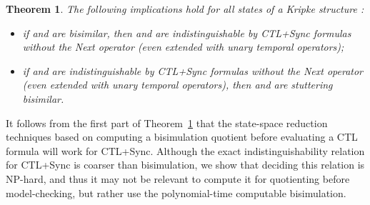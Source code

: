 \documentclass{article}
\newtheorem{theorem}{Theorem}
\begin{document}
\begin{theorem}\label{theo:CTL+Sync-without-next-indistinguishability}
The following implications hold for all states  of a Kripke structure :
\begin{itemize}

\item if  and  are bisimilar, then  and  are indistinguishable 
by CTL+Sync formulas without the Next operator (even extended with unary temporal operators);

\item if  and  are indistinguishable by CTL+Sync formulas without the Next operator
(even extended with unary temporal operators), then  and  are stuttering bisimilar.

\end{itemize}
\end{theorem}

It follows from the first part of Theorem~\ref{theo:CTL+Sync-without-next-indistinguishability}
that the state-space reduction techniques based on computing a bisimulation quotient before evaluating
a CTL formula will work for CTL+Sync. Although the exact indistinguishability
relation for CTL+Sync is coarser than bisimulation, we show that deciding this 
relation is NP-hard, and thus it may not be relevant to compute it for
quotienting before model-checking, but rather use the polynomial-time
computable bisimulation.
\end{document}
